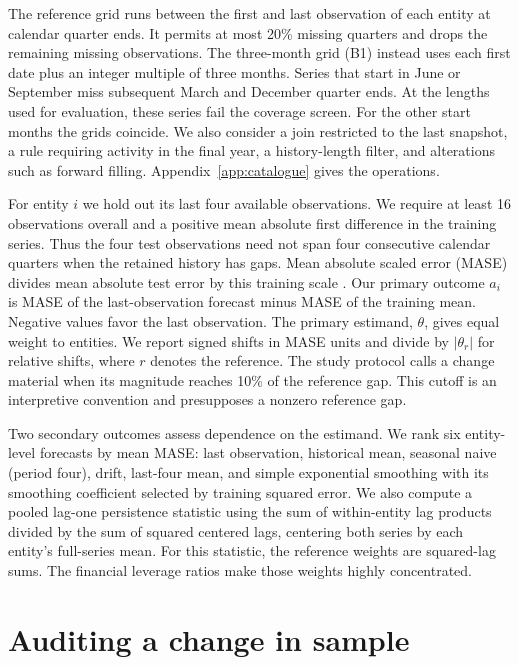 \documentclass[linenumber]{jdsart}
\begin{document}
The reference grid runs between the first and last observation of each entity at calendar quarter ends. It permits at most 20\% missing quarters and drops the remaining missing observations. The three-month grid (B1) instead uses each first date plus an integer multiple of three months. Series that start in June or September miss subsequent March and December quarter ends. At the lengths used for evaluation, these series fail the coverage screen. For the other start months the grids coincide. We also consider a join restricted to the last snapshot, a rule requiring activity in the final year, a history-length filter, and alterations such as forward filling. Appendix~\ref{app:catalogue} gives the operations.

For entity \(i\) we hold out its last four available observations. We require at least 16 observations overall and a positive mean absolute first difference in the training series. Thus the four test observations need not span four consecutive calendar quarters when the retained history has gaps. Mean absolute scaled error (MASE) divides mean absolute test error by this training scale \citep{hyndman}. Our primary outcome \(a_i\) is MASE of the last-observation forecast minus MASE of the training mean. Negative values favor the last observation. The primary estimand, \(\theta\), gives equal weight to entities. We report signed shifts in MASE units and divide by \(\lvert\theta_r\rvert\) for relative shifts, where \(r\) denotes the reference. The study protocol calls a change material when its magnitude reaches 10\% of the reference gap. This cutoff is an interpretive convention and presupposes a nonzero reference gap.

Two secondary outcomes assess dependence on the estimand. We rank six entity-level forecasts by mean MASE: last observation, historical mean, seasonal naive (period four), drift, last-four mean, and simple exponential smoothing with its smoothing coefficient selected by training squared error. We also compute a pooled lag-one persistence statistic using the sum of within-entity lag products divided by the sum of squared centered lags, centering both series by each entity's full-series mean. For this statistic, the reference weights are squared-lag sums. The financial leverage ratios make those weights highly concentrated.

\section{Auditing a change in sample}\label{sec:method}
\end{document}
